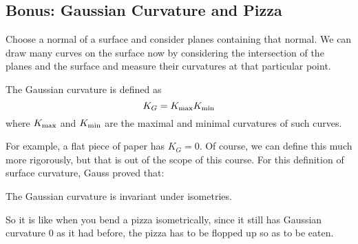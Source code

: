 \subsection{Bonus: Gaussian Curvature and Pizza}
Choose a normal of a surface and consider planes containing that normal.
We can draw many curves on the surface now by considering the intersection of the planes and the surface and measure their curvatures at that particular point.
\begin{definition}
    The Gaussian curvature is defined as
    $$K_G=K_{\rm max} K_{\rm min}$$
    where $K_{\rm max}$ and $K_{\rm min}$ are the maximal and minimal curvatures of such curves.
\end{definition}
For example, a flat piece of paper has $K_G=0$.
Of course, we can define this much more rigorously, but that is out of the scope of this course.
For this definition of surface curvature, Gauss proved that:
\begin{theorem}
    The Gaussian curvature is invariant under isometries.
\end{theorem}
So it is like when you bend a pizza isometrically, since it still has Gaussian curvature $0$ as it had before, the pizza has to be flopped up so as to be eaten.